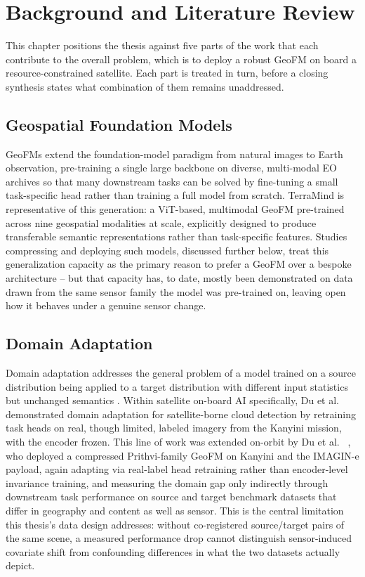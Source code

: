 \chapter{Background and Literature Review}
\label{chap:background}

This chapter positions the thesis against five parts of the work that each contribute to the overall problem, which is to deploy a robust GeoFM on board a resource-constrained satellite.
Each part is treated in turn, before a closing synthesis states what combination of them remains unaddressed.

\section{Geospatial Foundation Models}

GeoFMs extend the foundation-model paradigm from natural images to Earth observation, pre-training a single large backbone on diverse, multi-modal EO archives so that many downstream tasks can be solved by fine-tuning a small task-specific head rather than training a full model from scratch.
TerraMind\cite{jakubik2025terramind} is representative of this generation: a ViT-based, multimodal GeoFM pre-trained across nine geospatial modalities at scale, explicitly designed to produce transferable semantic representations rather than task-specific features.
Studies compressing and deploying such models, discussed further below, treat this generalization capacity as the primary reason to prefer a GeoFM over a bespoke architecture -- but that capacity has, to date, mostly been demonstrated on data drawn from the same sensor family the model was pre-trained on, leaving open how it behaves under a genuine sensor change.

\section{Domain Adaptation}

Domain adaptation addresses the general problem of a model trained on a source distribution being applied to a target distribution with different input statistics but unchanged semantics \cite{kouw2019introductiondomainadaptationtransfer}.
Within satellite on-board AI specifically, Du et al.
\ \cite{du2024domainadaptation} demonstrated domain adaptation for satellite-borne cloud detection by retraining task heads on real, though limited, labeled imagery from the Kanyini mission, with the encoder frozen.
This line of work was extended on-orbit by Du et al.
\ \cite{du2025onorbitdemonstrationgeospatialfoundation}, who deployed a compressed Prithvi-family GeoFM on Kanyini and the IMAGIN-e payload, again adapting via real-label head retraining rather than encoder-level invariance training, and measuring the domain gap only indirectly through downstream task performance on source and target benchmark datasets that differ in geography and content as well as sensor.
This is the central limitation this thesis's data design addresses: without co-registered source/target pairs of the same scene, a measured performance drop cannot distinguish sensor-induced covariate shift from confounding differences in what the two datasets actually depict.


